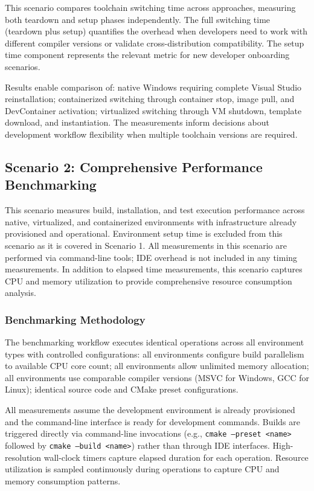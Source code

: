 This scenario compares toolchain switching time across approaches, measuring both teardown and setup phases independently.
The full switching time (teardown plus setup) quantifies the overhead when developers need to work with different compiler versions or validate cross-distribution compatibility.
The setup time component represents the relevant metric for new developer onboarding scenarios.

Results enable comparison of: native Windows requiring complete Visual Studio reinstallation; containerized switching through container stop, image pull, and DevContainer activation; virtualized switching through VM shutdown, template download, and instantiation.
The measurements inform decisions about development workflow flexibility when multiple toolchain versions are required.

\subsection{Scenario 2: Comprehensive Performance Benchmarking}

This scenario measures build, installation, and test execution performance across native, virtualized, and containerized environments with infrastructure already provisioned and operational.
Environment setup time is excluded from this scenario as it is covered in Scenario 1.
All measurements in this scenario are performed via command-line tools; IDE overhead is not included in any timing measurements.
In addition to elapsed time measurements, this scenario captures CPU and memory utilization to provide comprehensive resource consumption analysis.

\subsubsection{Benchmarking Methodology}

The benchmarking workflow executes identical operations across all environment types with controlled configurations: all environments configure build parallelism to available CPU core count; all environments allow unlimited memory allocation; all environments use comparable compiler versions (MSVC for Windows, GCC for Linux); identical source code and CMake preset configurations.

All measurements assume the development environment is already provisioned and the command-line interface is ready for development commands.
Builds are triggered directly via command-line invocations (e.g., \texttt{cmake --preset <name>} followed by \texttt{cmake --build <name>}) rather than through IDE interfaces.
High-resolution wall-clock timers capture elapsed duration for each operation.
Resource utilization is sampled continuously during operations to capture CPU and memory consumption patterns.

